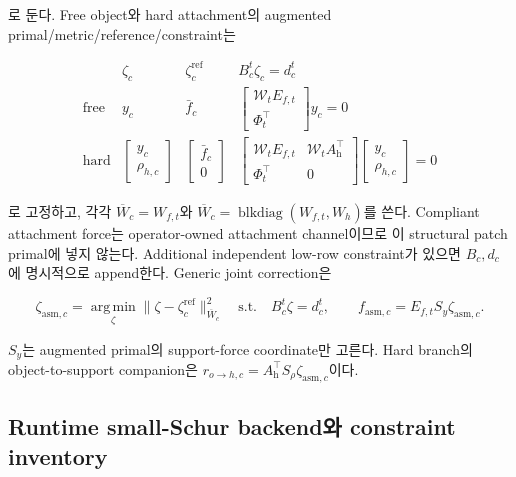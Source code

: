 \documentclass[11pt,a4paper]{article}
\newcommand{\argmin}{\operatorname*{arg\,min}}
\begin{document}
로 둔다. Free object와 hard attachment의 augmented primal/metric/reference/constraint는

\begin{equation}
\begin{array}{c|c|c|c}
 &\zeta_c&\zeta_c^{\mathrm{ref}}&B_c^t\zeta_c=d_c^t\\
\hline
\mathrm{free}
&y_c&\bar f_c
&\begin{bmatrix}\mathcal W_tE_{f,t}\\\Phi_t^\top\end{bmatrix}y_c=0\\[0.8em]
\mathrm{hard}
&\begin{bmatrix}y_c\\\rho_{h,c}\end{bmatrix}
&\begin{bmatrix}\bar f_c\\0\end{bmatrix}
&\begin{bmatrix}
  \mathcal W_tE_{f,t}&\mathcal W_tA_{\mathrm h}^\top\\
  \Phi_t^\top&0
 \end{bmatrix}
 \begin{bmatrix}y_c\\\rho_{h,c}\end{bmatrix}=0
\end{array}
  \label{eq:structural-augmented-constraints}
\end{equation}

로 고정하고, 각각
\(\overline W_c=W_{f,t}\)와
\(\overline W_c=\operatorname{blkdiag}(W_{f,t},W_h)\)를 쓴다.
Compliant attachment force는 operator-owned attachment channel이므로 이 structural patch primal에 넣지 않는다.
Additional independent low-row constraint가 있으면 \(B_c,d_c\)에 명시적으로 append한다.
Generic joint correction은

\begin{equation}
  \zeta_{\mathrm{asm},c}
  =\argmin_\zeta
  \|\zeta-\zeta_c^{\mathrm{ref}}\|_{\overline W_c}^2
  \quad\mathrm{s.t.}\quad B_c^t\zeta=d_c^t,
  \qquad
  f_{\mathrm{asm},c}=E_{f,t}S_y\zeta_{\mathrm{asm},c}.
  \label{eq:conservative-assembly}
\end{equation}

\(S_y\)는 augmented primal의 support-force coordinate만 고른다.
Hard branch의 object-to-support companion은
\(r_{o\rightarrow h,c}=A_{\mathrm h}^\top S_\rho\zeta_{\mathrm{asm},c}\)이다.

\subsection*{Runtime small-Schur backend와 constraint inventory}
\end{document}
